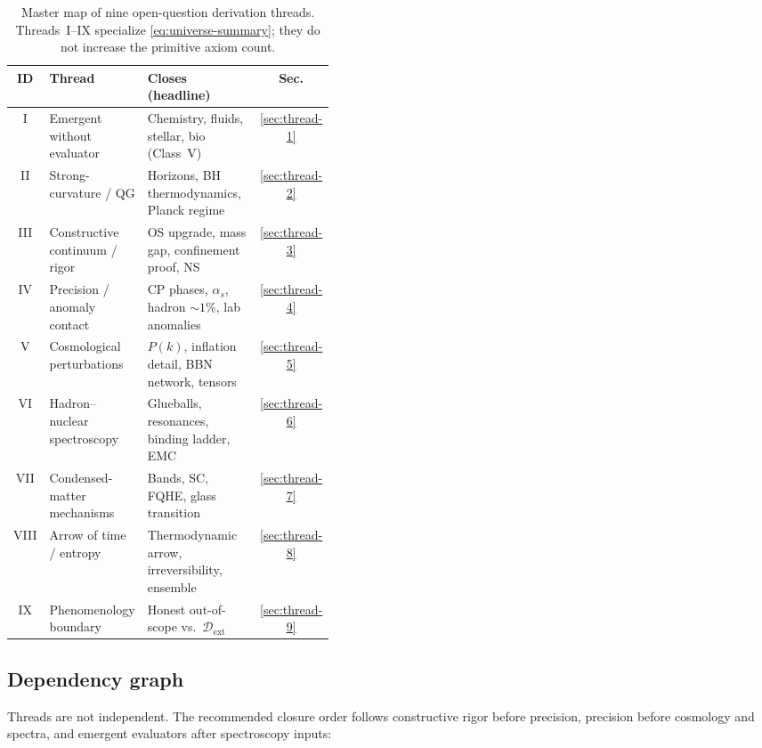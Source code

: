 \begin{table}[ht]
\centering
\small
\renewcommand{\arraystretch}{1.10}
\begin{tabular}{@{}clp{0.42\linewidth}c@{}}
\toprule
\textbf{ID} & \textbf{Thread} & \textbf{Closes (headline)} & \textbf{Sec.} \\
\midrule
I &
  Emergent without evaluator &
  Chemistry, fluids, stellar, bio (Class~V) &
  \ref{sec:thread-1} \\
II &
  Strong-curvature / QG &
  Horizons, BH thermodynamics, Planck regime &
  \ref{sec:thread-2} \\
III &
  Constructive continuum / rigor &
  OS upgrade, mass gap, confinement proof, NS &
  \ref{sec:thread-3} \\
IV &
  Precision / anomaly contact &
  CP phases, $\alpha_s$, hadron $\sim 1\%$, lab anomalies &
  \ref{sec:thread-4} \\
V &
  Cosmological perturbations &
  $P(k)$, inflation detail, BBN network, tensors &
  \ref{sec:thread-5} \\
VI &
  Hadron--nuclear spectroscopy &
  Glueballs, resonances, binding ladder, EMC &
  \ref{sec:thread-6} \\
VII &
  Condensed-matter mechanisms &
  Bands, SC, FQHE, glass transition &
  \ref{sec:thread-7} \\
VIII &
  Arrow of time / entropy &
  Thermodynamic arrow, irreversibility, ensemble &
  \ref{sec:thread-8} \\
IX &
  Phenomenology boundary &
  Honest out-of-scope vs.\ $\mathcal{D}_{\mathrm{ext}}$ &
  \ref{sec:thread-9} \\
\bottomrule
\end{tabular}
\caption{Master map of nine open-question derivation threads. Threads~I--IX
specialize \eqref{eq:universe-summary}; they do not increase the primitive
axiom count.}
\label{tab:open-threads-master}
\end{table}

\subsection{Dependency graph}
\label{sec:open-threads:dependencies}

Threads are not independent. The recommended closure order follows
constructive rigor before precision, precision before cosmology and spectra,
and emergent evaluators after spectroscopy inputs:

